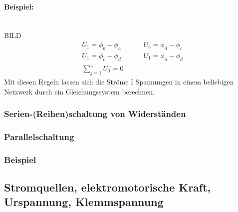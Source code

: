 \documentclass[11pt]{article}
\begin{document}
	\paragraph{Beispiel:} \hfill \\
	BILD
	\begin{align*}
	&U_1 = \phi_b - \phi_a \hspace{1cm} & U_3 = \phi_d - \phi_c \\
	&U_1 = \phi_c - \phi_d \hspace{1cm} & U_1 = \phi_a - \phi_d \\
	&{\displaystyle\sum_{j=1}^{4} Uj} = 0
	\end{align*}
	Mit diesen Regeln lassen sich die Ströme  I Spannungen in einem beliebigen Netzwerk durch ein Gleichungssystem berechnen.
	
	\subsubsection{Serien-(Reihen)schaltung von Widerständen}
	
	\subsubsection{Parallelschaltung}
	
	\subsubsection{Beispiel}
	
	\subsection{Stromquellen, elektromotorische Kraft, Urspannung, Klemmspannung}
				
\end{document}
